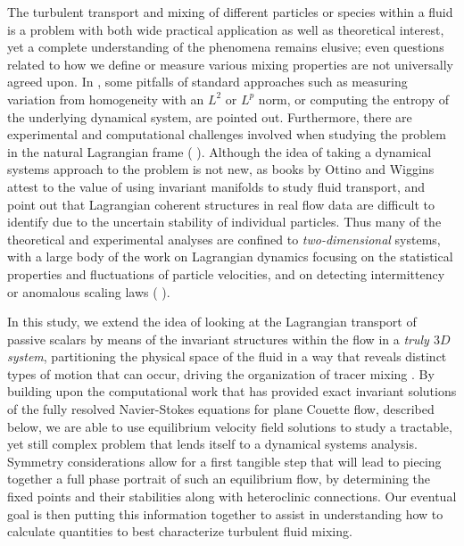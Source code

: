 \documentclass[letter,12pt,openany]{article}
\begin{document}
The turbulent transport and mixing of different particles or species within a fluid is a problem with both wide practical application as well as theoretical interest, yet a complete understanding of the phenomena remains elusive; even questions related to how we define or measure various mixing properties are not universally agreed upon. In \cite{Mathew}, some pitfalls of standard approaches such as measuring variation from homogeneity with an $L^2$ or $L^p$ norm, or computing the entropy of the underlying dynamical system, are pointed out. Furthermore, there are experimental and computational challenges involved when studying the problem in the natural Lagrangian frame (\cite{MHPRS07} \cite{ABBBBB08} \cite{Braun1} \cite{Mordant}). Although the idea of taking a dynamical systems approach to the problem is not new, as books by Ottino \cite{Botti89} and Wiggins \cite{wiggbook} attest to the value of using invariant manifolds to study fluid transport, \cite{MHPRS07} and \cite{HallerLagrangian} point out that Lagrangian coherent structures in real flow data are difficult to identify due to the uncertain stability of individual particles. Thus many of the theoretical and experimental analyses are confined to \textit{two-dimensional} systems, with a large body of the work on Lagrangian dynamics focusing on the statistical properties and fluctuations of particle velocities, and on detecting intermittency or anomalous scaling laws (\cite{Nzerem} \cite{Mordant} \cite{ABBBBB08} \cite{Falkovich}).

In this study, we extend the idea of looking at the Lagrangian transport of passive scalars by means of the invariant structures within the flow in a \textit{truly $3D$ system}, partitioning the physical space of the fluid in a way that reveals distinct types of motion that can occur, driving the organization of tracer mixing \cite{HallerLagrangian}. By building upon the computational work that has provided exact invariant solutions of the fully resolved Navier-Stokes equations for plane Couette flow, described below, we are able to use equilibrium velocity field solutions to study a tractable, yet still complex problem that lends itself to a dynamical systems analysis. Symmetry considerations allow for a first tangible step that will lead to piecing together a full phase portrait of such an equilibrium flow, by determining the fixed points and their stabilities along with heteroclinic connections.  Our eventual goal is then putting this information
together to assist in understanding how to calculate quantities to best characterize turbulent fluid mixing.
\end{document}
